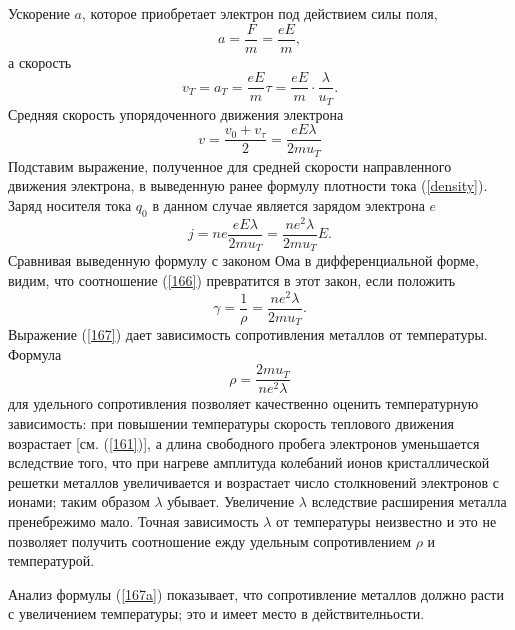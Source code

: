 \documentclass[a4paper,10pt]{book}
\begin{document}
Ускорение $a$, которое приобретает электрон под действием силы поля,
\begin{equation*}
 a = \frac{F}{m} = \frac{eE}{m},
\end{equation*}
а скорость 
\begin{equation}\label{164}
 v_T = a_T = \frac{eE}{m}\tau = \frac{eE}{m} \cdot \frac{\lambda}{u_T}.
\end{equation}
Средняя скорость упорядоченного движения электрона
\begin{equation}\label{165}
 v = \frac{v_0 + v_\tau}{2} = \frac{eE\lambda}{2mu_T}
\end{equation}
Подставим выражение, полученное для средней скорости направленного движения электрона, в выведенную ранее формулу плотности тока (\ref{density}).
Заряд носителя тока $q_0$ в данном случае является зарядом электрона $e$
\begin{equation}\label{166}
 j = ne\frac{eE\lambda}{2mu_T} = \frac{ne^2\lambda}{2mu_T}E.
\end{equation}
Сравнивая выведенную формулу с законом Ома в дифференциальной форме, видим, что соотношение (\ref{166}) превратится в этот закон, если положить
\begin{equation}\label{167}
 \gamma = \frac{1}{\rho} = \frac{ne^2\lambda}{2mu_T}.
\end{equation}
Выражение (\ref{167}) дает зависимость сопротивления металлов от температуры. Формула
\begin{equation}\label{167a}
 \rho = \frac{2mu_T}{ne^2\lambda}
\end{equation}
для удельного сопротивления позволяет качественно оценить температурную зависимость: при повышении температуры скорость теплового движения
возрастает [см. (\ref{161})], а длина свободного пробега электронов уменьшается вследствие того, что при нагреве амплитуда колебаний ионов
кристаллической решетки металлов увеличивается и возрастает число столкновений электронов с ионами; таким образом $\lambda$ убывает. Увеличение
$\lambda$ вследствие расширения металла пренебрежимо мало. Точная зависимость $\lambda$ от температуры неизвестно и это не позволяет получить
соотношение ежду удельным сопротивлением $\rho$ и температурой. 

Анализ формулы (\ref{167a}) показывает, что сопротивление металлов должно расти с увеличением температуры; это и имеет место в действителньости.
\end{document}
